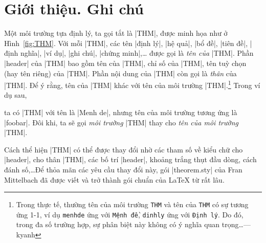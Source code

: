 \documentclass[11pt,oneside]{ltxdoc}
\theoremstyle{marginbreak}
\theoremstyle{changebreak}
\theoremstyle{change}
\theoremstyle{plain}
\theoremstyle{nonumberplain}
\begin{document}
\newpage

\tableofcontents

\pagebreak


\section{Giới thiệu. Ghi chú}

Một môi trường tựa định lý, ta gọi tắt là |THM|, được minh họa
như ở Hình~\ref{fig:THM}. Với mỗi |THM|, các tên |định lý|, |hệ quả|, |bổ đề|, |tiên đề|,
|định nghĩa|, |ví dụ|, |ghi chú|, |chứng minh|,\ldots
được gọi là \emph{tên của} |THM|.
Phần |header| của |THM| bao gồm tên của |THM|, chỉ số của |THM|,
tên tuỳ chọn (hay tên riêng) của |THM|. Phần nội dung của |THM|
còn gọi là \emph{thân} của |THM|. Để ý rằng, tên của |THM| khác
với tên của môi trường |THM|.\footnote{Trong thực tế, thường tên
của môi trường \texttt{THM} và tên của \texttt{THM} có sự tương ứng
1-1, ví dụ \texttt{menhde} ứng với \texttt{Mệnh đề},
\texttt{dinhly} ứng với \texttt{Định lý}. Do đó, trong đa số trường hợp,
sự phân biệt này không có ý nghĩa quan trọng\ldots --- kyanh}
Trong ví dụ sau,
\begin{example}
  \newtheorem{foobar}{Menh de}
\end{example}
ta có |THM| với tên là |Menh de|, nhưng tên của môi trường
tương ứng là |foobar|. Đôi khi, ta sẽ gọi \emph{môi trường} |THM| thay cho
\emph{tên của môi trường} |THM|.

\medskip
Cách thể hiện |THM| có thể được thay đổi nhờ các tham số về
kiểu chữ cho |header|, cho thân |THM|, các bố trí |header|, khoảng trắng
thụt đầu dòng, cách đánh số,\ldots Để thỏa mãn các yêu cầu thay đổi này,
gói |theorem.sty| của Fran Mittelbach đã được viết và trở thành
gói chuẩn của \LaTeX{} từ rất lâu.
\end{document}
